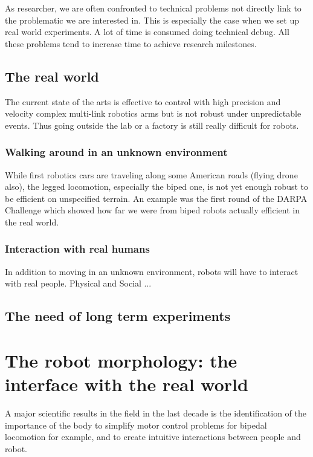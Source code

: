 As researcher, we  are often confronted to technical problems not directly link to the problematic we are interested in.
This is especially the case when we set up real world experiments.
A lot of time is consumed doing technical debug.
All these problems tend to increase time to achieve research milestones.


\subsection{The real world} %

The current state of the arts is effective to control with high precision and velocity complex multi-link robotics arms but is not robust under unpredictable events.
Thus going outside the lab or a factory is still really difficult for robots.

\subsubsection{Walking around in an unknown environment} %
While first robotics cars are traveling along some American roads (flying drone also), the legged locomotion, especially the biped one, is not yet enough robust to be efficient on unspecified terrain.
An example was the first round of the DARPA Challenge which showed how far we were from biped robots actually efficient in the real world.


\subsubsection{Interaction with real humans} %
In addition to moving in an unknown environment, robots will have to interact with real people.
Physical and Social ...


\subsection{The need of long term experiments} %


\section{The robot morphology: the interface with the real world} %

A major scientific results in the field in the last decade is the identification of the importance of the body to simplify motor control problems for bipedal locomotion for example, and to create intuitive interactions between people and robot.

